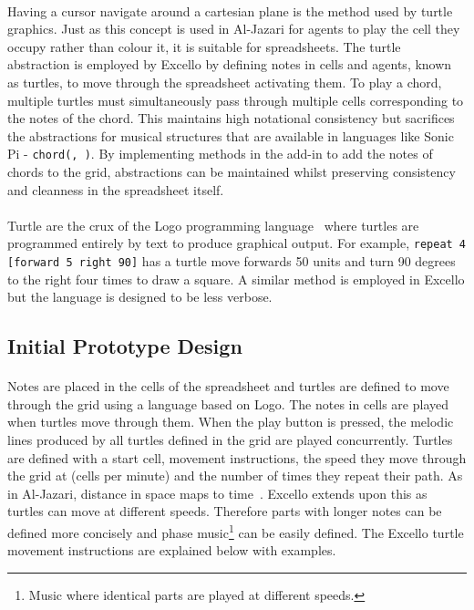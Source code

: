 \paragraph{} Having a cursor navigate around a cartesian plane is the method used by turtle graphics. Just as this concept is used in Al-Jazari for agents to play the cell they occupy rather than colour it, it is suitable for spreadsheets. The turtle abstraction is employed by Excello by defining notes in cells and agents, known as turtles, to move through the spreadsheet activating them. To play a chord, multiple turtles must simultaneously pass through multiple cells corresponding to the notes of the chord. This maintains high notational consistency but sacrifices the abstractions for musical structures that are available in languages like Sonic Pi - \texttt{chord(, )}. By implementing methods in the add-in to add the notes of chords to the grid, abstractions can be maintained whilst preserving consistency and cleanness in the spreadsheet itself.

\paragraph{} Turtle are the crux of the Logo programming language~\cite{goldman:turtle} where turtles are programmed entirely by text to produce graphical output. For example, \texttt{repeat 4 [forward 5 right 90]} has a turtle move forwards 50 units and turn 90 degrees to the right four times to draw a square. A similar method is employed in Excello but the language is designed to be less verbose.

\subsection{Initial Prototype Design}

\paragraph{} Notes are placed in the cells of the spreadsheet and turtles are defined to move through the grid using a language based on Logo. The notes in cells are played when turtles move through them. When the play button is pressed, the melodic lines produced by all turtles defined in the grid are played concurrently. Turtles are defined with a start cell, movement instructions, the speed they move through the grid at (cells per minute) and the number of times they repeat their path. As in Al-Jazari, distance in space maps to time~\cite{mclean:texture}. Excello extends upon this as turtles can move at different speeds. Therefore parts with longer notes can be defined more concisely and phase music\footnote{Music where identical parts are played at different speeds.} can be easily defined. The Excello turtle movement instructions are explained below with examples.

